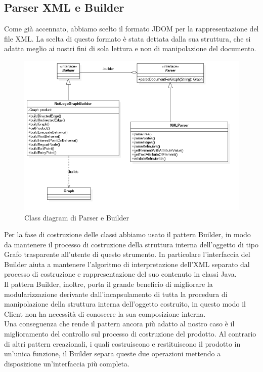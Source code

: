 \subsection{Parser XML e Builder}
Come già accennato, abbiamo scelto il formato JDOM per la rappresentazione del file XML. La scelta di questo formato è stata dettata dalla sua struttura, che si adatta meglio ai nostri fini di sola lettura e non di manipolazione del documento.\\
\begin{figure}[htbp]
\centering
\includegraphics[width=\textwidth,height=\textheight,keepaspectratio]{images/builder-diagram.png}
\caption{Class diagram di Parser e Builder}
\label{fig:builder-diagram}
\end{figure}
Per la fase di costruzione delle classi abbiamo usato il pattern Builder, in modo da mantenere il processo di costruzione della struttura interna dell'oggetto di tipo Grafo trasparente all'utente di questo strumento. In particolare l'interfaccia del Builder aiuta a mantenere l'algoritmo di interpretazione dell'XML separato dal processo di costruzione e rappresentazione del suo contenuto in classi Java.\\
Il pattern Builder, inoltre, porta il grande beneficio di migliorare la modularizzazione derivante dall'incapsulamento di tutta la procedura di manipolazione della struttura interna dell'oggetto costruito, in questo modo il Client non ha necessità di conoscere la sua composizione interna.\\
Una conseguenza che rende il pattern ancora più adatto al nostro caso è il miglioramento del controllo sul processo di costruzione del prodotto. Al contrario di altri pattern creazionali, i quali costruiscono e restituiscono il prodotto in un'unica funzione, il Builder separa queste due operazioni mettendo a disposizione un'interfaccia più completa.\\
